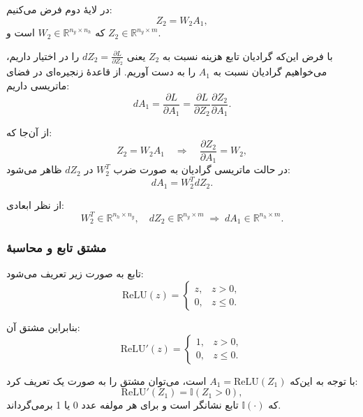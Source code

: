 \documentclass{article}
\begin{document}
در لایهٔ دوم فرض می‌کنیم:
\begin{equation}
	Z_2 = W_2 A_1,
\end{equation}
که $W_2 \in \mathbb{R}^{n_y \times n_h}$ است و $Z_2 \in \mathbb{R}^{n_y \times m}$.

با فرض این‌که گرادیان تابع هزینه نسبت به $Z_2$ یعنی $dZ_2 = \frac{\partial L}{\partial Z_2}$ را در اختیار داریم، می‌خواهیم گرادیان نسبت به $A_1$ را به دست آوریم. از قاعدهٔ زنجیره‌ای در فضای ماتریسی داریم:
\begin{equation}
	dA_1 = \frac{\partial L}{\partial A_1}
	= \frac{\partial L}{\partial Z_2} \frac{\partial Z_2}{\partial A_1}.
\end{equation}

از آن‌جا که:
\begin{equation}
	Z_2 = W_2 A_1 \quad \Rightarrow \quad \frac{\partial Z_2}{\partial A_1} = W_2,
\end{equation}
در حالت ماتریسی گرادیان به صورت ضرب $W_2^T$ در $dZ_2$ ظاهر می‌شود:
\begin{equation}
	dA_1 = W_2^T dZ_2.
\end{equation}

از نظر ابعادی:
\[
W_2^T \in \mathbb{R}^{n_h \times n_y}, \quad
dZ_2 \in \mathbb{R}^{n_y \times m}
\;\Rightarrow\;
dA_1 \in \mathbb{R}^{n_h \times m}.
\]

\subsubsection{مشتق تابع  و محاسبهٔ }

تابع  به صورت زیر تعریف می‌شود:
\begin{equation}
	\mathrm{ReLU}(z) =
	\begin{cases}
		z, & z > 0, \\
		0, & z \le 0.
	\end{cases}
\end{equation}

بنابراین مشتق آن:
\begin{equation}
	\mathrm{ReLU}'(z) =
	\begin{cases}
		1, & z > 0, \\
		0, & z \le 0.
	\end{cases}
\end{equation}

با توجه به این‌که $A_1 = \mathrm{ReLU}(Z_1)$ است، می‌توان مشتق را به صورت یک  تعریف کرد:
\begin{equation}
	\mathrm{ReLU}'(Z_1) = \mathbb{I}(Z_1 > 0),
\end{equation}
که $\mathbb{I}(\cdot)$ تابع نشانگر است و برای هر مولفه عدد 0 یا 1 برمی‌گرداند.
\end{document}
